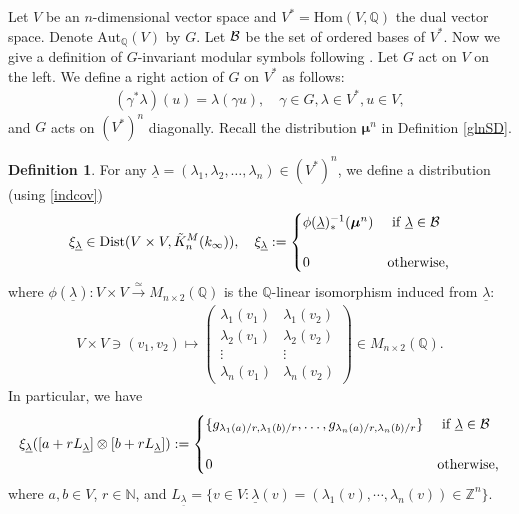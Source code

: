 \documentclass[12pt,amstex,amssymb]{article}
\theoremstyle{plain}
\theoremstyle{definition}
\newtheorem{definition}[theorem]{Definition}
\def\lra{\longrightarrow}
\def\g{\gamma}
\def\cB{{\cal B}}
\def\cS{{\cal S}}
\def\Z{{\mathbb Z}}
\def\N{{\mathbb N}}
\def\Q{{\mathbb Q}}
\def\Hom{\text{Hom}}
\def\Aut{\text{Aut}}
\def\ulambda {{\underline{\lambda}}}
\def\l{\lambda}
\def\g{\gamma}
\newcommand{\be}{\begin{eqnarray*}}
\newcommand{\ee}{\end{eqnarray*}}
\newcommand{\bea}{\begin{eqnarray}}
\newcommand{\eea}{\end{eqnarray}}
\newcommand{\Dist}{\operatorname{Dist}}
\begin{document}
Let $V$ be an $n$-dimensional vector space and $V^*=\Hom(V,\Q)$ the dual vector space. Denote $\Aut_\Q(V)$ by $G$. Let $\cB$ be the set of ordered bases of $V^*$.
Now we give a definition of $G$-invariant modular symbols following \cite{AR}.
Let $G$ act on $V$ on the left. We define a right action of $G$ on $V^*$ as follows:
\be
(\g^* \l)(u ) = \l (\g u), \quad \g \in G, \l \in V^*, u \in V,
\ee
and $G$ acts on $(V^*)^n$ diagonally.
Recall the distribution ${\bm\mu}^n$ in Definition \ref{glnSD}.
\begin{definition}\label{glnm}
For any $\ulambda = (\lambda_1,\lambda_2,\ldots,\lambda_n) \in (V^\ast)^n$, we define a distribution (using \eqref{indcov})
\bea \label{keydef}
\xi_\ulambda \in \Dist(V \times  V, \tilde K^M_n(k_\infty)), \quad 
\xi_\ulambda := \begin{cases}
\phi(\ulambda)^{-1}_\ast ({\bm\mu}^n)  & \hbox{ \rm if\  }\ulambda\in \cB\\
\\
			 0 &\hbox{\rm otherwise,}
\end{cases}
\eea
where $\phi(\ulambda): V\times V\xrightarrow{\simeq} M_{n\times 2}(\Q)$ is the $\Q$-linear isomorphism induced from $\ulambda$:
\be
 V\times V \ni (v_1, v_2) \mapsto 
\begin{pmatrix}
\l_1(v_1) & \l_1(v_2) \\
\l_2(v_1) & \l_2(v_2) \\
\vdots & \vdots \\
\l_n(v_1) & \l_n(v_2) 
\end{pmatrix} \in M_{n\times 2}(\Q).
\ee
In particular, we have 
$$
\xi_\ulambda ([a+ rL_{\ulambda}]\otimes [b+rL_{\ulambda}]) := \begin{cases}
\{g_{\lambda_1(a)/r, \lambda_1(b)/r}, \ldots,g_{\lambda_n(a)/r, \lambda_n(b)/r} \}  & \hbox{ \rm if\  }\ulambda\in \cB\\
\\
			 0 &\hbox{\rm otherwise,}
\end{cases}
$$
where $a, b \in V$, $r \in \N$, and $L_\ulambda =\{ v \in V : \ulambda (v)=(\lambda_1(v), \cdots, \lambda_n(v)) \in \Z^n\}$. 
\end{definition}
\end{document}
